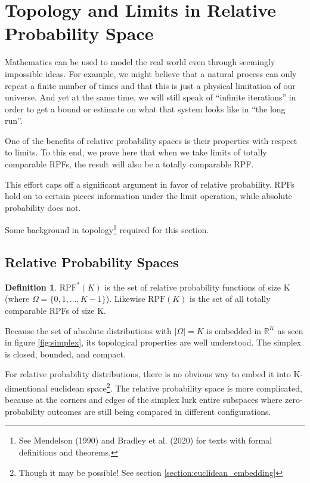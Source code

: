 \documentclass[twoside]{article}
\newcommand{\quotes}[1]{``#1''}
\theoremstyle{plain}%
\theoremstyle{definition}
\newtheorem{definition}{Definition}[section]
\theoremstyle{remark}
\begin{document}
\section{Topology and Limits in Relative Probability Space}
\label{section:topology}

Mathematics can be used to model the real world even through seemingly impossible ideas. For example, we might believe that a natural process can only repeat a finite number of times and that this is just a physical limitation of our universe. And yet at the same time, we will still speak of \quotes{infinite iterations} in order to get a bound or estimate on what that system looks like in \quotes{the long run}.

One of the benefits of relative probability spaces is their properties with respect to limits. To this end, we prove here that when we take limits of totally comparable RPFs, the result will also be a totally comparable RPF.

This effort caps off a significant argument in favor of relative probability. RPFs hold on to certain pieces information under the limit operation, while absolute probability does not.

Some background in topology\footnote{See Mendelson (1990) \cite{mendelson} and Bradley et al. (2020) \cite{bradley} for texts with formal definitions and theorems.} required for this section.

\subsection{Relative Probability Spaces}

\begin{definition}
\(\text{RPF}^{\ast}(K)\) is the set of relative probability functions of size K (where \(\Omega = \{0, 1, ..., K - 1\}\)). Likewise \(\text{RPF}(K)\) is the set of all totally comparable RPFs of size K.
\end{definition}

Because the set of absolute distributions with \(|\Omega| = K\) is embedded in \(\mathbb{R}^K\) as seen in figure \ref{fig:simplex}, its topological properties are well understood. The simplex is closed, bounded, and compact.

For relative probability distributions, there is no obvious way to embed it into K-dimentional euclidean space\footnote{Though it may be possible! See section \ref{section:euclidean_embedding}}. The relative probability space is more complicated, because at the corners and edges of the simplex lurk entire subspaces where zero-probability outcomes are still being compared in different configurations.
\end{document}
